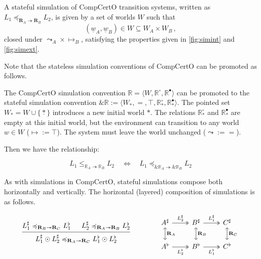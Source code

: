 \documentclass[acmsmall,screen,review,anonymous]{acmart}
\newcommand{\que}{\circ}
\newcommand{\ans}{\bullet}
\renewcommand{\preceq}{\preccurlyeq}
\newcommand{\intl}[1]{\underline{#1}}
\begin{document}
\begin{definition}
A stateful simulation of CompCertO transition systems,
written as
$L_1 \preceq_{\mathbf{R}_A \twoheadrightarrow \mathbf{R}_B} L_2$,
is given by a set of worlds $W$ such that
\[ (\intl{w}_A, \intl{w}_B) \in W \subseteq W_A \times W_B \,, \]
closed under ${\leadsto_A} \times {\mapsto_B}$,
satisfying the properties given in
\autoref{fig:simint} and
\autoref{fig:simext}.
\end{definition}

Note that the stateless simulation conventions of CompCertO
can be promoted as follows.

\begin{definition}
The CompCertO simulation convention
$\mathbb{R} = \langle W, \mathbb{R}^\que, \mathbb{R}^\ans \rangle$
can be promoted to the stateful simulation convention
$\&\mathbb{R} :=
 \langle W_*, {=}, \top, \mathbb{R}^\que_*, \mathbb{R}^\ans_* \rangle$.
The pointed set $W_* = W \cup \{ \intl{*} \}$
introduces a new initial world $*$.
The relations $\mathbb{R}^\que_*$ and $\mathbb{R}^\ans_*$
are empty at this initial world,
but the environment can transition
to any world $w \in W$ (${\mapsto} := \top$).
The system must leave the world unchanged (${\leadsto} := {=}$).
\end{definition}

Then we have the relationship:
\begin{lemma} \label{lemma:stsim}
\[
  L_1 \le_{\mathbb{R}_A \twoheadrightarrow \mathbb{R}_B} L_2
  \quad \Leftrightarrow \quad
  L_1 \preceq_{\&\mathbb{R}_A \twoheadrightarrow \&\mathbb{R}_B} L_2
\]
\end{lemma}

As with simulations in CompCertO,
stateful simulations compose both horizontally and vertically.
The horizontal (layered) composition of simulations
is as follows.

\begin{lemma}
\[
  \begin{prooftree}
    \hypo{
      L_1^\sharp
      \preceq_{\mathbf{R}_B \twoheadrightarrow \mathbf{R}_C}
      L_1^\flat}
    \hypo{
      L_2^\sharp
      \preceq_{\mathbf{R}_A \twoheadrightarrow \mathbf{R}_B}
      L_2^\flat}
    \infer2{
      L_1^\sharp \odot L_2^\sharp
      \preceq_{\mathbf{R}_A \twoheadrightarrow \mathbf{R}_C}
      L_1^\flat \odot L_2^\flat}
  \end{prooftree}
  \qquad \qquad
  \begin{tikzcd}
    A^\sharp \ar[r, twoheadrightarrow, "L_2^\sharp"]
	     \ar[d, leftrightarrow, "\mathbf{R}_A"] &
    B^\sharp \ar[r, twoheadrightarrow, "L_1^\sharp"]
	     \ar[d, leftrightarrow, "\mathbf{R}_B"] &
    C^\sharp \ar[d, leftrightarrow, "\mathbf{R}_C"]
    \\
    A^\flat \ar[r, twoheadrightarrow, "L_2^\flat"'] &
    B^\flat \ar[r, twoheadrightarrow, "L_1^\flat"'] &
    C^\flat
  \end{tikzcd}
\]
\end{lemma}
\end{document}
